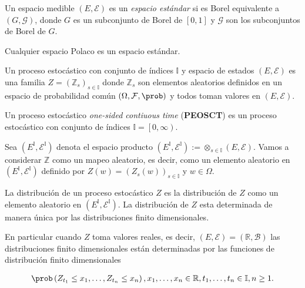 \begin{Def}
Un espacio medible  $\left(E,\mathcal{E}\right)$ es un \textit{espacio est\'andar} si es Borel equivalente a $\left(G,\mathcal{G}\right)$, donde $G$ es un subconjunto de Borel de $\left[0,1\right]$ y $\mathcal{G}$ son los subconjuntos de Borel de $G$.
\end{Def}

\begin{Note}
Cualquier espacio Polaco es un espacio est\'andar.
\end{Note}


\begin{Def}
Un proceso estoc\'astico con conjunto de \'indices $\mathbb{I}$ y espacio de estados $\left(E,\mathcal{E}\right)$ es una familia $Z=\left(\mathbb{Z}_{s}\right)_{s\in\mathbb{I}}$ donde $\mathbb{Z}_{s}$ son elementos aleatorios definidos en un espacio de probabilidad com\'un $\left(\Omega,\mathcal{F},\prob\right)$ y todos toman valores en $\left(E,\mathcal{E}\right)$.
\end{Def}

\begin{Def}
Un proceso estoc\'astico \textit{one-sided contiuous time} (\textbf{PEOSCT}) es un proceso estoc\'astico con conjunto de \'indices $\mathbb{I}=\left[0,\infty\right)$.
\end{Def}


Sea $\left(E^{\mathbb{I}},\mathcal{E}^{\mathbb{I}}\right)$ denota el espacio producto $\left(E^{\mathbb{I}},\mathcal{E}^{\mathbb{I}}\right):=\otimes_{s\in\mathbb{I}}\left(E,\mathcal{E}\right)$. Vamos a considerar $\mathbb{Z}$ como un mapeo aleatorio, es decir, como un elemento aleatorio en $\left(E^{\mathbb{I}},\mathcal{E}^{\mathbb{I}}\right)$ definido por $Z\left(w\right)=\left(Z_{s}\left(w\right)\right)_{s\in\mathbb{I}}$ y $w\in\Omega$.

\begin{Note}
La distribuci\'on de un proceso estoc\'astico $Z$ es la distribuci\'on de $Z$ como un elemento aleatorio en $\left(E^{\mathbb{I}},\mathcal{E}^{\mathbb{I}}\right)$. La distribuci\'on de $Z$ esta determinada de manera \'unica por las distribuciones finito dimensionales.
\end{Note}

\begin{Note}
En particular cuando $Z$ toma valores reales, es decir, $\left(E,\mathcal{E}\right)=\left(\mathbb{R},\mathcal{B}\right)$ las distribuciones finito dimensionales est\'an determinadas por las funciones de distribuci\'on finito dimensionales

\begin{eqnarray}
\prob\left(Z_{t_{1}}\leq x_{1},\ldots,Z_{t_{n}}\leq x_{n}\right),x_{1},\ldots,x_{n}\in\mathbb{R},t_{1},\ldots,t_{n}\in\mathbb{I},n\geq1.
\end{eqnarray}
\end{Note}

